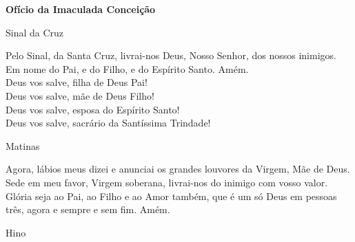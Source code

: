 \newpage
\begin{center}
    \textbf{Ofício da Imaculada Conceição}
\end{center}
\begin{center}
    Sinal da Cruz
\end{center}
\begin{flushleft}
    Pelo Sinal, \grecrossRed{} da Santa Cruz, livrai-nos Deus, \grecrossRed{} Nosso Senhor, dos nossos \grecrossRed{} inimigos. Em nome do Pai, \grecrossRed{} e do Filho, e do Espírito Santo. Amém.
    \vspace{.2cm} \\
    Deus vos salve, filha de Deus Pai! \\
    Deus vos salve, mãe de Deus Filho! \\
    Deus vos salve, esposa do Espírito Santo! \\
    Deus vos salve, sacrário da Santíssima Trindade!
\end{flushleft}
\begin{center}
    Matinas
\end{center}
\begin{flushleft}
    Agora, lábios meus dizei e anunciai os grandes louvores da Virgem, Mãe de Deus. Sede em meu favor, Virgem soberana, livrai-nos do inimigo com vosso valor. Glória seja ao Pai, ao Filho e ao Amor também, que é um só Deus em pessoas três, agora e sempre e sem fim. Amém.
\end{flushleft}
\begin{center}
    \textcolor{VioletRed3}{Hino}
\end{center}
